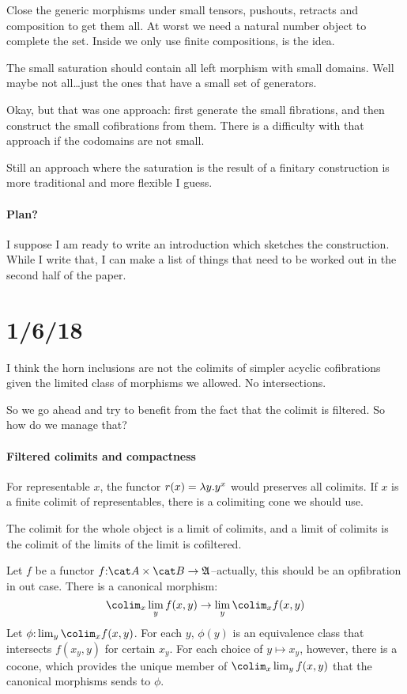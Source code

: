 \documentclass[csh.tex]{subfiles}
\begin{document}
Close the generic morphisms under small tensors, pushouts, retracts and composition to get them all. At worst we need a natural number object to complete the set. Inside we only use finite compositions, is the idea.

The small saturation should contain all left morphism with small domains. Well maybe not all\dots just the ones that have a small set of generators.

Okay, but that was one approach: first generate the small fibrations, and then construct the small cofibrations from them. There is a difficulty with that approach if the codomains are not small.

Still an approach where the saturation is the result of a finitary construction is more traditional and more flexible I guess.

\paragraph{Plan?}
I suppose I am ready to write an introduction which sketches the construction. While I write that, I can make a list of things that need to be worked out in the second half of the paper.

\section{1/6/18}

I think the horn inclusions are not the colimits of simpler acyclic cofibrations given the limited class of morphisms we allowed. No intersections.

So we go ahead and try to benefit from the fact that the colimit is filtered. So how do we manage that?

\paragraph{Filtered colimits and compactness}
For representable $x$, the functor $r(x) = \lambda y . y^x$ would preserves all colimits. If $x$ is a finite colimit of representables, there is a colimiting cone we should  use.

The colimit for the whole object is a limit of colimits, and a limit of colimits is the colimit of the limits of the limit is cofiltered.

Let $f$ be a functor $f\of \cat A\times \cat B\to\ambient$--actually, this should be an opfibration in out case. There is a canonical morphism:
\[ \colim_x \lim_y f(x,y) \to \lim_y \colim_x f(x,y) \]
Let $\phi\of\lim_y \colim_x f(x,y)$. For each $y$, $\phi(y)$ is an equivalence class that intersects $f(x_y,y)$ for certain $x_y$. For each choice of $y\mapsto x_y$, however, there is a cocone, which provides the unique member of $\colim_x \lim_y f(x,y)$ that the canonical morphisms sends to $\phi$.
\end{document}
